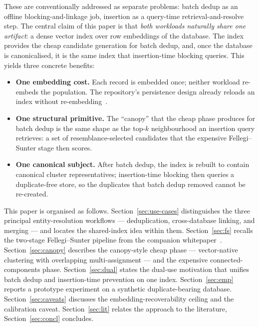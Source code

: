 \documentclass[11pt]{article}
\begin{document}
These are conventionally addressed as separate problems: batch dedup as an offline
blocking-and-linkage job, insertion as a query-time retrieval-and-resolve step. The central
claim of this paper is that \emph{both workloads naturally share one artifact}: a dense
vector index over row embeddings of the database. The index provides the cheap candidate
generation for batch dedup, and, once the database is canonicalised, it is the same index
that insertion-time blocking queries. This yields three concrete benefits:

\begin{itemize}
  \item \textbf{One embedding cost.} Each record is embedded once; neither workload re-embeds
        the population. The repository's persistence design already reloads an index without
        re-embedding~\cite{pipeline}.
  \item \textbf{One structural primitive.} The ``canopy'' that the cheap phase produces for
        batch dedup is the same shape as the top-$k$ neighbourhood an insertion query
        retrieves: a set of resemblance-selected candidates that the expensive Fellegi--Sunter
        stage then scores.
  \item \textbf{One canonical subject.} After batch dedup, the index is rebuilt to contain
        canonical cluster representatives; insertion-time blocking then queries a
        duplicate-free store, so the duplicates that batch dedup removed cannot be re-created.
\end{itemize}

This paper is organised as follows. Section~\ref{sec:use-cases} distinguishes the three
principal entity-resolution workflows --- deduplication, cross-database linking, and merging
--- and locates the shared-index idea within them. Section~\ref{sec:fs} recalls the two-stage
Fellegi--Sunter pipeline from the companion whitepaper~\cite{pipeline}. Section~\ref{sec:canopy}
describes the canopy-style cheap phase --- vector-native clustering with overlapping
multi-assignment --- and the expensive connected-components phase. Section~\ref{sec:dual}
states the dual-use motivation that unifies batch dedup and insertion-time prevention on one
index. Section~\ref{sec:emp} reports a prototype experiment on a synthetic duplicate-bearing
database. Section~\ref{sec:caveats} discusses the embedding-recoverability ceiling and the
calibration caveat. Section~\ref{sec:lit} relates the approach to the literature,
Section~\ref{sec:concl} concludes.
\end{document}
